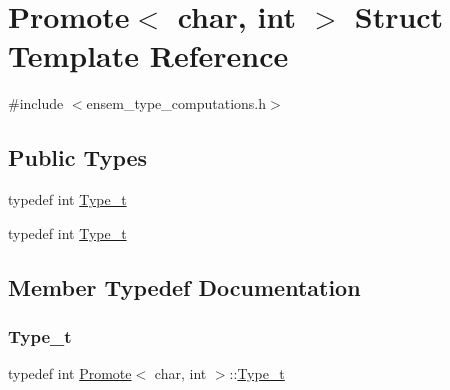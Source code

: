 \hypertarget{structPromote_3_01char_00_01int_01_4}{}\section{Promote$<$ char, int $>$ Struct Template Reference}
\label{structPromote_3_01char_00_01int_01_4}


{\ttfamily \#include $<$ensem\+\_\+type\+\_\+computations.\+h$>$}

\subsection*{Public Types}
\begin{DoxyCompactItemize}
\item 
typedef int \mbox{\hyperlink{structPromote_3_01char_00_01int_01_4_aa4465fce51bfd64e6f93b628ecbec70f}{Type\+\_\+t}}
\item 
typedef int \mbox{\hyperlink{structPromote_3_01char_00_01int_01_4_aa4465fce51bfd64e6f93b628ecbec70f}{Type\+\_\+t}}
\end{DoxyCompactItemize}


\subsection{Member Typedef Documentation}
\mbox{\label{structPromote_3_01char_00_01int_01_4_aa4465fce51bfd64e6f93b628ecbec70f}} 
\subsubsection{\texorpdfstring{Type\_t}{Type\_t}\hspace{0.1cm}{\footnotesize\ttfamily [1/2]}}
{\footnotesize\ttfamily typedef int \mbox{\hyperlink{structPromote}{Promote}}$<$ char, int $>$\+::\mbox{\hyperlink{structPromote_3_01char_00_01int_01_4_aa4465fce51bfd64e6f93b628ecbec70f}{Type\+\_\+t}}}

\mbox{\label{structPromote_3_01char_00_01int_01_4_aa4465fce51bfd64e6f93b628ecbec70f}} 
